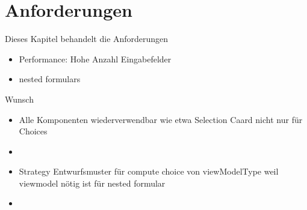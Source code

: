 \section{Anforderungen}

Dieses Kapitel behandelt die Anforderungen

\begin{itemize}
    \item Performance: Hohe Anzahl Eingabefelder
    \item nested formulars
\end{itemize}


Wunsch
\begin{itemize}
	\item Alle Komponenten wiederverwendbar wie etwa Selection Caard nicht nur für Choices
	\item 
\end{itemize}

\begin{itemize}
	\item Strategy Entwurfsmuster für compute choice von viewModelType weil viewmodel nötig ist für nested formular
	\item 
\end{itemize}